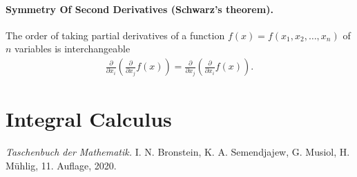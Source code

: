 \documentclass{article}
\begin{document}
\paragraph{Symmetry Of Second Derivatives (Schwarz's theorem).} The order of taking partial derivatives of a function $f(x) = f(x_1, x_2, \dots , x_n)$ of $n$ variables is interchangeable
\begin{gather*}
    \frac{\partial}{\partial x_i} \left( \frac{\partial}{\partial x_j} f(x) \right) = \frac{\partial}{\partial x_j} \left( \frac{\partial}{\partial x_i} f(x) \right).
\end{gather*}




\section{Integral Calculus} \label{integralCalculus}




\begin{thebibliography}{9}
     \emph{Taschenbuch der Mathematik.}
    I. N. Bronstein, K. A. Semendjajew, G. Musiol, H. Mühlig, 11. Auflage, 2020.
\end{thebibliography}
\end{document}
